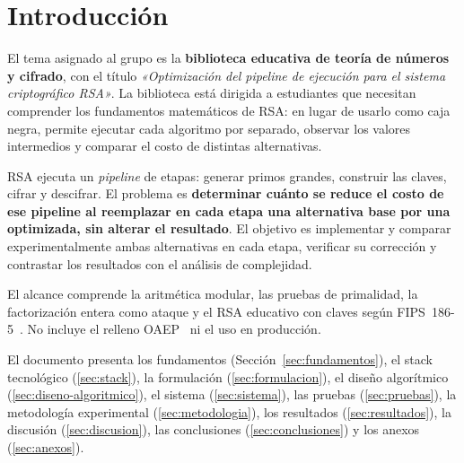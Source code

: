 \newpage
\section{Introducción}
\label{sec:introduccion}

El tema asignado al grupo es la \textbf{biblioteca educativa de teoría de
números y cifrado}, con el título \emph{«Optimización del pipeline de ejecución
para el sistema criptográfico RSA»}. La biblioteca está dirigida a estudiantes
que necesitan comprender los fundamentos matemáticos de RSA: en lugar de usarlo
como caja negra, permite ejecutar cada algoritmo por separado, observar los
valores intermedios y comparar el costo de distintas alternativas.

RSA ejecuta un \emph{pipeline} de etapas: generar primos grandes, construir las
claves, cifrar y descifrar. El problema es \textbf{determinar cuánto se reduce
el costo de ese pipeline al reemplazar en cada etapa una alternativa base por
una optimizada, sin alterar el resultado}. El objetivo es implementar y
comparar experimentalmente ambas alternativas en cada etapa, verificar su
corrección y contrastar los resultados con el análisis de complejidad.

El alcance comprende la aritmética modular, las pruebas de primalidad, la
factorización entera como ataque y el RSA educativo con claves según
FIPS~186-5~\cite{fips186}. No incluye el relleno OAEP~\cite{rfc8017} ni el
uso en producción.

El documento presenta los fundamentos (Sección~\ref{sec:fundamentos}), el
stack tecnológico (\ref{sec:stack}), la formulación (\ref{sec:formulacion}), el
diseño algorítmico (\ref{sec:diseno-algoritmico}), el sistema
(\ref{sec:sistema}), las pruebas (\ref{sec:pruebas}), la metodología
experimental (\ref{sec:metodologia}), los resultados (\ref{sec:resultados}), la
discusión (\ref{sec:discusion}), las conclusiones (\ref{sec:conclusiones}) y
los anexos (\ref{sec:anexos}).

